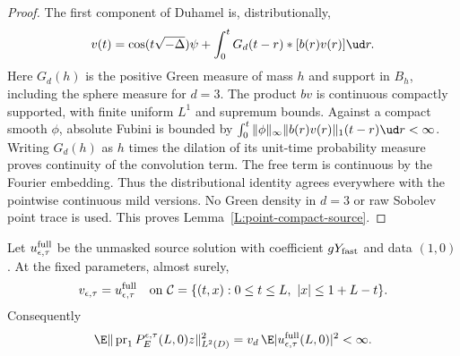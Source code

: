 \begin{proof}
  The first component of Duhamel is, distributionally,
  \[
    v(t)=\cos(t\sqrt{-\Delta})\psi+
    \int_0^t G_d(t-r)*[b(r)v(r)]\ud r .
  \]
  Here $G_d(h)$ is the positive Green measure of mass $h$
  and support in $B_h$, including the sphere measure for $d=3$.
  The product $bv$ is continuous compactly supported, with finite
  uniform $L^1$ and supremum bounds.
  Against a compact smooth $\phi$, absolute Fubini is bounded by
  $\int_0^t\|\phi\|_\infty\|b(r)v(r)\|_1(t-r)\ud r<\infty$.
  Writing $G_d(h)$ as $h$ times the dilation of its unit-time
  probability measure proves continuity of the convolution term.
  The free term is continuous by the Fourier embedding.
  Thus the distributional identity agrees everywhere with the
  pointwise continuous mild versions.
  No Green density in $d=3$ or raw Sobolev point trace is used.
  This proves Lemma~\ref{L:point-compact-source}.
\end{proof}

\begin{proposition}
  \label{P:point-source-cone}
  Let $u_{\epsilon,\tau}^{\rm full}$ be the unmasked source solution
  with coefficient $gY_{\rm fast}$ and data $(1,0)$.
  At the fixed parameters, almost surely,
  \[
    v_{\epsilon,\tau}=u_{\epsilon,\tau}^{\rm full}
    \quad\hbox{on }\mathcal C=
    \{(t,x):0\le t\le L,\ |x|\le1+L-t\}.
  \]
  Consequently
  \begin{equation}\label{E:point-source-square-average}
    \E\|\operatorname{pr}_1P_E^{\epsilon,\tau}(L,0)z\|_{L^2(D)}^2
    =v_d\,\E|u_{\epsilon,\tau}^{\rm full}(L,0)|^2<\infty .
  \end{equation}
\end{proposition}


